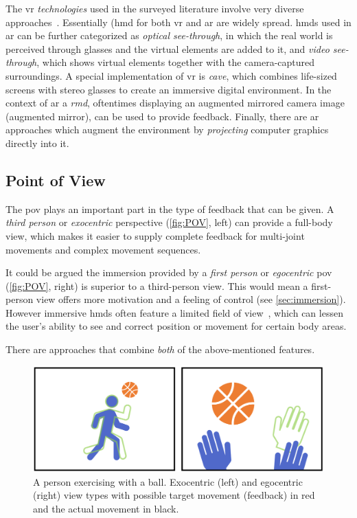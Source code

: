 The \acrshort{vr} \textit{technologies} used in the surveyed literature involve very diverse approaches~\cite{schmalstieg2016augmented}. Essentially (\acrfull{hmd} for both \acrshort{vr} and \acrshort{ar} are widely spread. \acrshort{hmd}s used in \acrshort{ar} can be further categorized as \textit{optical see-through}, in which the real world is perceived through glasses and the virtual elements are added to it, and \textit{video see-through}, which shows virtual elements together with the camera-captured surroundings. A special implementation of \acrshort{vr} is \emph{\acrfull{cave}}, which combines life-sized screens with stereo glasses to create an immersive digital environment. In the context of \acrshort{ar} a \emph{\acrfull{rmd}}, oftentimes displaying an augmented mirrored camera image (augmented mirror), can be used to provide feedback. Finally, there are \acrshort{ar} approaches which augment the environment by \emph{projecting} computer graphics directly into it.

\subsection*{Point of View \label{sec:POV}}
The \acrfull{pov} plays an important part in the type of feedback that can be given. A \textit{third person} or \textit{exocentric} perspective (\autoref{fig:POV}, left) can provide a full-body view, which makes it easier to supply complete feedback for multi-joint movements and complex movement sequences.

It could be argued the immersion provided by a \textit{first person} or \textit{egocentric} \acrshort{pov}  (\autoref{fig:POV}, right) is superior to a third-person view. This would mean a first-person view offers more motivation and a feeling of control (see \autoref{sec:immersion}). However immersive \acrshort{hmd}s often feature a limited field of view~\cite{trepkowski2019enf}, which can lessen the user's ability to see and correct position or movement for certain body areas. 

There are approaches that combine \textit{both} of the above-mentioned features.

\begin{figure}[b!th]
    \centering
    \includegraphics[width=\linewidth]{pictures/PointOfView.PNG}
    \caption[Comparison of an exocentric and egocentric perspective.]{A person exercising with a ball. Exocentric (left) and egocentric (right) view types with possible target movement (feedback) in red and the actual movement in black.\label{fig:POV}}
\end{figure}


